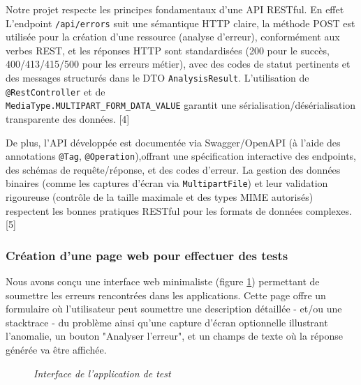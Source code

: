 \documentclass[12pt,a4paper]{report}
\begin{document}
	Notre projet respecte les principes fondamentaux d'une API RESTful. En effet L'endpoint \verb|/api/errors| suit une sémantique HTTP claire, la méthode POST est utilisée pour la création d'une ressource (analyse d'erreur), conformément aux verbes REST, et les réponses HTTP sont standardisées (200 pour le succès, 400/413/415/500 pour les erreurs métier), avec des codes de statut pertinents et des messages structurés dans le DTO \verb|AnalysisResult|. L'utilisation de \verb|@RestController| et de \\ \verb|MediaType.MULTIPART_FORM_DATA_VALUE| garantit une sérialisation/désérialisation transparente des données. [4]
	
	De plus, l'API développée est documentée via Swagger/OpenAPI (à l'aide des annotations \verb|@Tag|, \verb|@Operation|),offrant une spécification interactive des endpoints, des schémas de requête/réponse, et des codes d'erreur. La gestion des données binaires (comme les captures d'écran via \verb|MultipartFile|) et leur validation rigoureuse (contrôle de la taille maximale et des types MIME autorisés) respectent les bonnes pratiques RESTful pour les formats de données complexes. [5]
	
	\subsubsection{Création d'une page web pour effectuer des tests}
	
	Nous avons conçu une interface web minimaliste (figure \ref{fig:interface}) permettant de soumettre les erreurs rencontrées dans les applications. Cette page offre un formulaire où l'utilisateur peut soumettre une description détaillée - et/ou une stacktrace  - du problème ainsi qu’une capture d’écran optionnelle illustrant l’anomalie, un bouton "Analyser l'erreur", et un champs de texte où la réponse générée va être affichée.
	
	\begin{figure}[H]
		\centering
		\caption{\textit{Interface de l'application de test}}
		\label{fig:interface}
	\end{figure}
	
\end{document}
